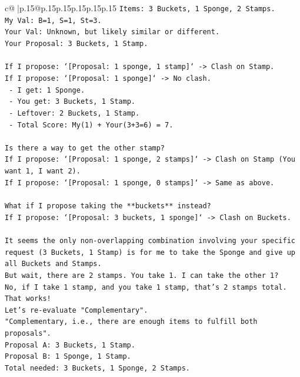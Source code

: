 \documentclass{article}
\begin{document}
{\begin{supertabular}{c@{$\;$}|p{.15\linewidth}@{}p{.15\linewidth}p{.15\linewidth}p{.15\linewidth}p{.15\linewidth}p{.15\linewidth}}
{{{\texttt{Items: 3 Buckets, 1 Sponge, 2 Stamps.} \\
\texttt{My Val: B=1, S=1, St=3.} \\
\texttt{Your Val: Unknown, but likely similar or different.} \\
\texttt{Your Proposal: 3 Buckets, 1 Stamp.} \\
\\ 
\texttt{If I propose: `{[}Proposal: 1 sponge, 1 stamp{]}` {-}> Clash on Stamp.} \\
\texttt{If I propose: `{[}Proposal: 1 sponge{]}` {-}> No clash.} \\
\texttt{   {-} I get: 1 Sponge.} \\
\texttt{   {-} You get: 3 Buckets, 1 Stamp.} \\
\texttt{   {-} Leftover: 2 Buckets, 1 Stamp.} \\
\texttt{   {-} Total Score: My(1) + Your(3+3=6) = 7.} \\
\\ 
\texttt{Is there a way to get the other stamp?} \\
\texttt{If I propose: `{[}Proposal: 1 sponge, 2 stamps{]}` {-}> Clash on Stamp (You want 1, I want 2).} \\
\texttt{If I propose: `{[}Proposal: 1 sponge, 0 stamps{]}` {-}> Same as above.} \\
\\ 
\texttt{What if I propose taking the **buckets** instead?} \\
\texttt{If I propose: `{[}Proposal: 3 buckets, 1 sponge{]}` {-}> Clash on Buckets.} \\
\\ 
\texttt{It seems the only non{-}overlapping combination involving your specific request (3 Buckets, 1 Stamp) is for me to take the Sponge and give up all Buckets and Stamps.} \\
\texttt{But wait, there are 2 stamps. You take 1. I can take the other 1?} \\
\texttt{No, if I take 1 stamp, and you take 1 stamp, that's 2 stamps total. That works!} \\
\texttt{Let's re{-}evaluate "Complementary".} \\
\texttt{"Complementary, i.e., there are enough items to fulfill both proposals".} \\
\texttt{Proposal A: 3 Buckets, 1 Stamp.} \\
\texttt{Proposal B: 1 Sponge, 1 Stamp.} \\
\texttt{Total needed: 3 Buckets, 1 Sponge, 2 Stamps.} \\
}}}
\end{supertabular}}
\end{document}
